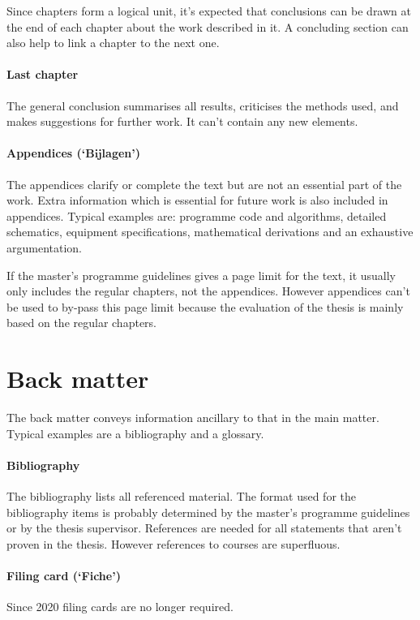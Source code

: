 \documentclass[11pt,article,oneside,a4paper]{memoir}
\newcommand\Dutch[1]{`\foreignlanguage{dutch}{#1}'}
\begin{document}
Since chapters form a logical unit, it's expected that conclusions can be
drawn at the end of each chapter about the work described in it. A
concluding section can also help to link a chapter to the next one.

\paragraph{Last chapter} The general conclusion summarises all results,
criticises the methods used, and makes suggestions for further work. It
can't contain any new elements.

\paragraph{Appendices (\Dutch{Bijlagen})} The appendices clarify or
complete the text but are not an essential part of the work. Extra
information which is essential for future work is also included in
appendices. Typical examples are: programme code and algorithms, detailed
schematics, equipment specifications, mathematical derivations and an
exhaustive argumentation.

If the master's programme guidelines gives a page limit for the text, it
usually only includes the regular chapters, not the appendices. However
appendices can't be used to by-pass this page limit because the evaluation of
the thesis is mainly based on the regular chapters.

\section{Back matter}
The back matter conveys information ancillary to that in the main matter.
Typical examples are a bibliography and a glossary.

\paragraph{Bibliography} The bibliography lists all referenced material. The
format used for the bibliography items is probably determined by the master's
programme guidelines or by the thesis supervisor. References are needed for all
statements that aren't proven in the thesis. However references to courses are
superfluous.

\paragraph{Filing card (\Dutch{Fiche})} Since 2020 filing cards are no longer
required.
\end{document}
